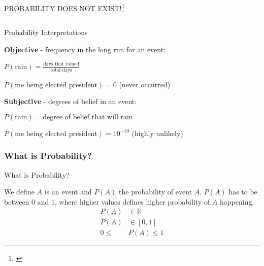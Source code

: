 \begin{frame}{PROBABILITY DOES NOT EXIST!\footnote{\textcite{definettiTheoryProbability1974}}}
\begin{columns}
\begin{column}{0.4\textwidth}
		\end{column}
	\end{columns}
\end{frame}

\begin{frame}{Probability Interpretations}
	\begin{vfilleditems}
		\item \textbf{Objective} - frequency in the long run for an event:
		\begin{vfilleditems}
			\item $P(\text{rain}) = \frac{\text{days that rained}}{\text{total days}}$
			\item $P(\text{me being elected president}) = 0$ (never occurred)
		\end{vfilleditems}
		\item \textbf{Subjective} - degrees of belief in an event:
		\begin{vfilleditems}
			\item $P(\text{rain}) = \text{degree of belief that will rain}$
			\item $P(\text{me being elected president}) = 10^{-10}$ (highly unlikely)
		\end{vfilleditems}
	\end{vfilleditems}
\end{frame}

\subsubsection{What is Probability?}
\begin{frame}{What is Probability?}
	\begin{defn}[Probability]
		We define $A$ is an event and $P(A)$ the probability of event $A$.
		$P(A)$ has to be between $0$ and $1$, where higher values defines
		higher probability of $A$ happening.
		$$
			\begin{aligned}
				P(A) & \in \mathbb{R} \\ P(A) & \in [0,1] \\ 0 \leq & P(A) \leq 1
			\end{aligned}
		$$
	\end{defn}
\end{frame}


